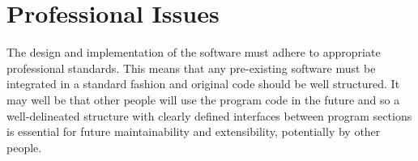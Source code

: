 \section{Professional Issues}
The design and implementation of the software must adhere to appropriate professional standards. This means that any pre-existing software must be integrated in a standard fashion and original code should be well structured. It may well be that other people will use the program code in the future and so a well-delineated structure with clearly defined interfaces between program sections is essential for future maintainability and extensibility, potentially by other people.